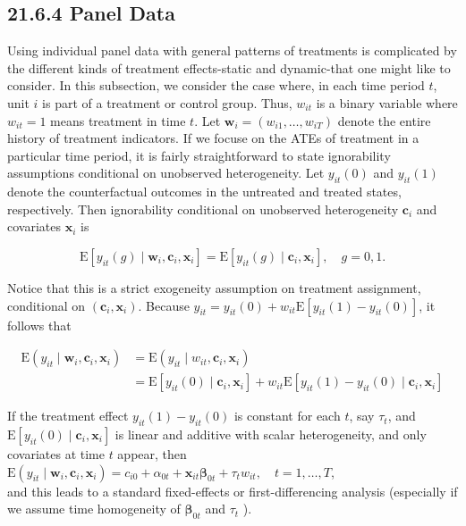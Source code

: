 \documentclass[10pt]{article}
\begin{document}
\subsection*{21.6.4 Panel Data}
Using individual panel data with general patterns of treatments is complicated by the different kinds of treatment effects-static and dynamic-that one might like to consider. In this subsection, we consider the case where, in each time period $t$, unit $i$ is part of a treatment or control group. Thus, $w_{i t}$ is a binary variable where $w_{i t}=1$ means treatment in time $t$. Let $\mathbf{w}_{i}=\left(w_{i 1}, \ldots, w_{i T}\right)$ denote the entire history of treatment indicators. If we focuse on the ATEs of treatment in a particular time period, it is fairly straightforward to state ignorability assumptions conditional on unobserved heterogeneity. Let $y_{i t}(0)$ and $y_{i t}(1)$ denote the counterfactual outcomes in the untreated and treated states, respectively. Then ignorability conditional on unobserved heterogeneity $\mathbf{c}_{i}$ and covariates $\mathbf{x}_{i}$ is


\begin{equation*}
\mathrm{E}\left[y_{i t}(g) \mid \mathbf{w}_{i}, \mathbf{c}_{i}, \mathbf{x}_{i}\right]=\mathrm{E}\left[y_{i t}(g) \mid \mathbf{c}_{i}, \mathbf{x}_{i}\right], \quad g=0,1 . \tag{21.132}
\end{equation*}


Notice that this is a strict exogeneity assumption on treatment assignment, conditional on $\left(\mathbf{c}_{i}, \mathbf{x}_{i}\right)$. Because $y_{i t}=y_{i t}(0)+w_{i t} \mathrm{E}\left[y_{i t}(1)-y_{i t}(0)\right]$, it follows that


\begin{align*}
\mathrm{E}\left(y_{i t} \mid \mathbf{w}_{i}, \mathbf{c}_{i}, \mathbf{x}_{i}\right) & =\mathrm{E}\left(y_{i t} \mid w_{i t}, \mathbf{c}_{i}, \mathbf{x}_{i}\right) \\
& =\mathrm{E}\left[y_{i t}(0) \mid \mathbf{c}_{i}, \mathbf{x}_{i}\right]+w_{i t} \mathrm{E}\left[y_{i t}(1)-y_{i t}(0) \mid \mathbf{c}_{i}, \mathbf{x}_{i}\right] \tag{21.133}
\end{align*}


If the treatment effect $y_{i t}(1)-y_{i t}(0)$ is constant for each $t$, say $\tau_{t}$, and $\mathrm{E}\left[y_{i t}(0) \mid \mathbf{c}_{i}, \mathbf{x}_{i}\right]$ is linear and additive with scalar heterogeneity, and only covariates at time $t$ appear, then\\
$\mathrm{E}\left(y_{i t} \mid \mathbf{w}_{i}, \mathbf{c}_{i}, \mathbf{x}_{i}\right)=c_{i 0}+\alpha_{0 t}+\mathbf{x}_{i t} \boldsymbol{\beta}_{0 t}+\tau_{t} w_{i t}, \quad t=1, \ldots, T$,\\
and this leads to a standard fixed-effects or first-differencing analysis (especially if we assume time homogeneity of $\boldsymbol{\beta}_{0 t}$ and $\tau_{t}$ ).
\end{document}
